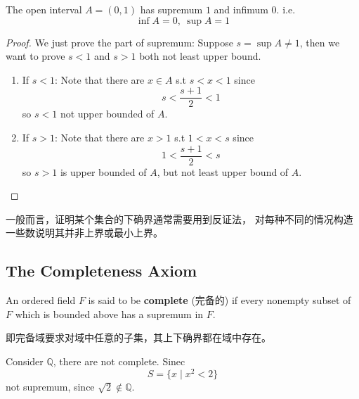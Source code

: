 \documentclass[
	UTF-8,
	11pt, %
	a4paper, %
]{LegrandOrangeBook}
\begin{document}
    \begin{example}\quad
            \item The open interval $A=(0,1)$ has supremum $1$ and infimum $0$. i.e.
            $$
            \inf A = 0,\ \sup A = 1
            $$
            \begin{proof}
                We just prove the part of supremum: Suppose $s = \sup A \neq 1$, 
                then we want to prove $s<1$ and $s>1$ both not least upper bound.
                \begin{enumerate}
                    \item If $s<1$: Note that there are $x \in A$ s.t $s<x<1$ since
                    $$ s < \dfrac{s+1}{2} < 1$$
                    so $s<1$ not upper bounded of $A$.
                    \item If $s>1$: Note that there are $x > 1$ s.t $1<x<s$ since
                    $$ 1 < \dfrac{s+1}{2} < s$$
                    so $s>1$ is upper bounded of $A$, but not least upper bound of $A$.
                \end{enumerate}
            \end{proof}
            \begin{remark}
                一般而言，证明某个集合的下确界通常需要用到反证法，
                对每种不同的情况构造一些数说明其并非上界或最小上界。
            \end{remark}
    \end{example}

    \subsection{The Completeness Axiom}

    \begin{definition}
    An ordered field $F$ is said to be \textbf{complete} (完备的) 
    if every nonempty subset of $F$ which is bounded above has a supremum in $F$.

    \end{definition}

    \begin{remark}
        即完备域要求对域中任意的子集，其上下确界都在域中存在。
    \end{remark}

    \begin{example}
        Consider $\mathbb{Q}$, there are not complete. Sinec
        $$
        S = \{ x \mid x^2 < 2 \}
        $$
        not supremum, since $\sqrt{2} \notin \mathbb{Q}$.
    \end{example}
\end{document}
